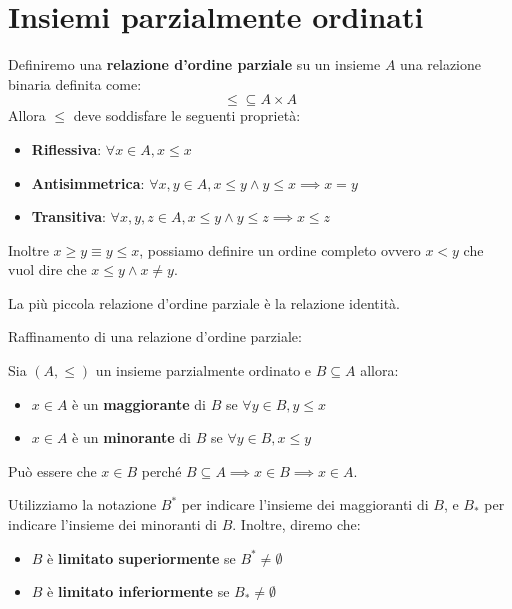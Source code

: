 \section{Insiemi parzialmente ordinati}
\begin{definizione}
    Definiremo una \textbf{relazione d'ordine parziale} su un insieme $A$ una
    relazione binaria definita come:
    \begin{equation}
        \leq \subseteq A \times A
    \end{equation}
    Allora $\leq$ deve soddisfare le seguenti proprietà:
    \begin{itemize}
        \item \textbf{Riflessiva}: $\forall x \in A, x \leq x$
        \item \textbf{Antisimmetrica}: $\forall x, y \in A, x \leq y \land y
                  \leq x \implies x = y$
        \item \textbf{Transitiva}: $\forall x, y, z \in A, x \leq y \land y \leq
                  z \implies x \leq z$
    \end{itemize}
\end{definizione}
Inoltre $x \geq y \equiv y \leq x$, possiamo definire un ordine completo ovvero
$x < y$ che vuol dire che $x \leq y \land x \neq y$.
\begin{osservazione}
    La più piccola relazione d'ordine parziale è la relazione identità.
\end{osservazione}
Raffinamento di una relazione d'ordine parziale:
\begin{definizione}
    Sia $(A,\leq)$ un insieme parzialmente ordinato e $B \subseteq A$ allora:
    \begin{itemize}
        \item $x \in A$ è un \textbf{maggiorante} di $B$ se $\forall y \in B, y
                  \leq x$
        \item $x \in A$ è un \textbf{minorante} di $B$ se $\forall y \in B, x
                  \leq y$
    \end{itemize}
    Può essere che $x \in B$ perché $B \subseteq A \implies x \in B \implies x \in A$.
\end{definizione}
Utilizziamo la notazione $B^\ast$ per indicare l'insieme dei maggioranti di $B$,
e $B_\ast$ per indicare l'insieme dei minoranti di $B$. Inoltre, diremo che:
\begin{itemize}
    \item $B$ è \textbf{limitato superiormente} se $B^\ast \neq \emptyset$
    \item $B$ è \textbf{limitato inferiormente} se $B_\ast \neq \emptyset$
\end{itemize}
